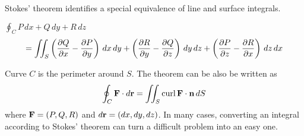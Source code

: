 
\newpage

\noindent
Stokes' theorem identifies a special equivalence of line and surface
integrals.

\bigskip
\noindent
$\displaystyle{\oint_C P\,dx+Q\,dy+R\,dz}$
$$=
\int\!\!\!\int_S
\left({\partial Q\over\partial x}-{\partial P\over\partial y}\right)\,dx\,dy
+
\left({\partial R\over\partial y}-{\partial Q\over\partial z}\right)\,dy\,dz
+
\left({\partial P\over\partial z}-{\partial R\over\partial x}\right)\,dz\,dx
$$

\noindent
Curve $C$ is the perimeter around $S$.
The theorem can be also be written as
$$\oint_C {\bf F}\cdot d{\bf r}
=\int\!\!\!\int_S\mathop{\rm curl}{\bf F}\cdot{\bf n}\,dS
$$
where ${\bf F}=(P,Q,R)$ and $d{\bf r}=(dx,dy,dz)$.
In many cases, converting an integral according to
Stokes' theorem can turn a difficult problem into an easy one.

